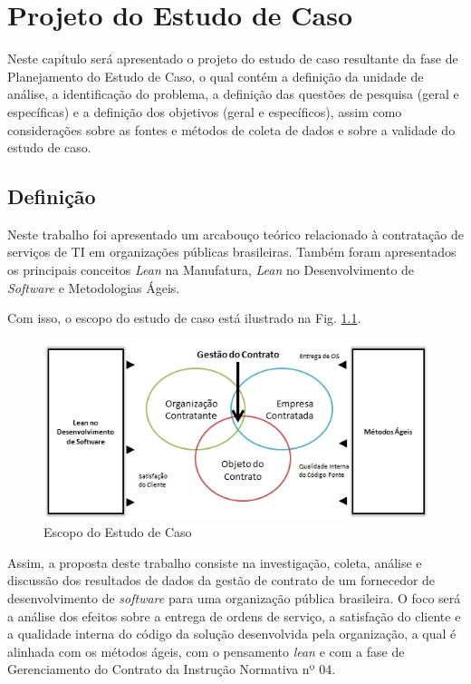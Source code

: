 \chapter[Projeto do Estudo de Caso]{Projeto do Estudo de Caso}

Neste capítulo será apresentado o projeto do estudo de caso resultante da fase de Planejamento do Estudo de Caso, o qual contém a definição da unidade de análise,  a identificação do problema, a definição das questões de pesquisa (geral e específicas) e a definição dos objetivos (geral e específicos), assim como considerações sobre as fontes e métodos de coleta de dados e sobre a validade do estudo de caso.

\section[Definição]{Definição}

Neste trabalho foi apresentado um arcabouço teórico relacionado à contratação de serviços de TI em organizações públicas brasileiras. Também foram apresentados os principais conceitos \textit{Lean} na Manufatura, \textit{Lean} no Desenvolvimento de \textit{Software} e Metodologias Ágeis.

Com isso, o escopo do estudo de caso está ilustrado na Fig. \ref{escopo}. 
\begin{figure}[H]
		\centering
		
			\includegraphics[scale=1.0]{figuras/escopoEC.png}
		
		\caption{Escopo do Estudo de Caso}
		\label{escopo}
		
\end{figure}


Assim, a proposta deste trabalho consiste na investigação, coleta, análise e discussão dos resultados de dados da gestão de contrato de um fornecedor de desenvolvimento de \textit{software} para uma organização pública brasileira. O foco será a análise dos efeitos sobre a entrega de ordens de serviço,  a satisfação do cliente e a qualidade interna do código da solução desenvolvida pela organização, a qual é alinhada com os métodos ágeis, com o pensamento \textit{lean} e com a fase de Gerenciamento do Contrato da Instrução Normativa nº 04.


